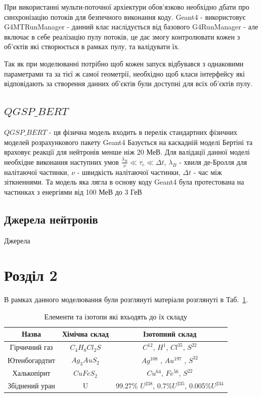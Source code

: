 \documentclass[a4paper, 14pt]{article}
\numberwithin{equation}{section}
\numberwithin{table}{section}
\begin{document}
При використанні мульти-поточної архіектури обов'язково необхідно дбати про синхронізацію потоків для безпечного виконання коду. Geant4 - використовує G4MTRunManager - данний клас наслідується від базового G4RunManager - але включає в себе реалізацію пулу потоків, це дає змогу контролювати кожен з об'єктів які створюється в рамках пулу, та валідувати їх. 

Так як при моделюванні потрібно щоб кожен запуск відбувався з однаковими параметрами та за тієї ж самої геометрії, необхідно щоб класи інтерфейсу які відповідають за створення данних об'єктів були доступні для всіх об'єктів пулу.

\subsection{$QGSP\_BERT$}
	$QGSP\_BERT$ - ця фізична модель входить в перелік стандартних фізичних моделей розрахункового пакету Geant4
	Базується на каскадній моделі Бертіні та враховує реакції для нейтронів менше ніж 20 МеВ. Для валідації данної моделі необхідне виконання наступних умов $\frac{\lambda_B}{\nu} \ll \tau_c \ll \Delta{t}$, $\lambda_B$ - хвиля де-Бролля для налітаючої частинки, $\nu$ - швидкість налітаючої частинки, $\Delta{t}$ - час між зіткненнями. Та модель яка лягла в основу коду Geant4 була протестована на частинках з енергіями від 100 МеВ до 3 ГеВ
\subsection{Джерела нейтронів}
	Джерела 

\newpage
\section{Розділ 2}
\setcounter{figure}{0}
В рамках данного моделювання були розглянуті матеріали розглянуті в Таб.~\ref{tabl:Materials}.
\begin{table}[h]
	\centering
	\begin{tabular}{|c|c|c|}
		\hline
		Назва & Хімічна склад & Ізотопний склад \\
		\hline
		Гірчичний газ & $C_4H_8Cl_2S$ & $C^{12}$, 	$H^1$, $Cl^{35}$, $S^{22}$ \\
		\hline
		Ютенбогардтит & $Ag_3AuS_2$ & $Ag^{108}$ , $Au^{197}$ , $S^{32}$ \\
		\hline
		Халькопірит & $CuFeS_2$ & $Cu^{64}$, $Fe^{56}$, $S^{22}$ \\
		\hline
		Збіднений уран & U & 99.27\% $U^{238}$, 0.7\%$U^{235}$, 0.005\%$U^{234}$\\
		\hline
	\end{tabular}
\caption{Елементи та ізотопи які вхьодять до їх складу} 
\label{tabl:Materials}
\end{table}
\end{document}
